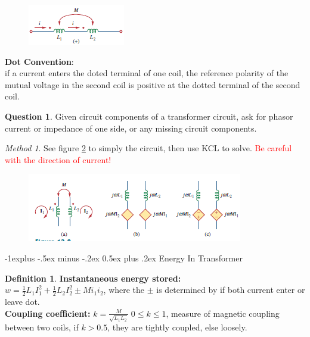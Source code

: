 \documentclass[10pt,landscape]{article}
\makeatletter
\renewcommand{\subsection}{\@startsection{subsection}{2}{0mm}%
                                {-1explus -.5ex minus -.2ex}%
                                {0.5ex plus .2ex}%
                                {\normalfont\normalsize\bfseries}}
\newcommand\todo[1]{\textcolor{red}{#1}}
\theoremstyle{definition}
\newtheorem*{question}{Question}
\newtheorem*{defin}{Definition}
\theoremstyle{remark}
\newtheorem*{method}{Method}
\makeatother
\begin{document}
\begin{multicols}{3}
\begin{figure}[H]
    \centering
    \includegraphics[width=0.5\linewidth]{202/figure/transformer_2_a.png}
    \caption{}
    \label{fig:trans_series}
\end{figure}

\textbf{Dot Convention}: \\
if a current enters the doted terminal of one coil, the reference polarity of the mutual voltage in the second coil is positive at the dotted terminal of the second coil.

\begin{question}
Given circuit components of a transformer circuit, ask for phasor current or impedance of one side, or any missing circuit components. 
\end{question}

\begin{method}
See figure \ref{fig:trans_simplification} to simply the circuit, then use KCL to solve. \todo{Be careful with the direction of current!}
\end{method}

\begin{figure}[H]
    \centering
    \includegraphics[width=\linewidth]{202/figure/transformer_1.png}
    \caption{}
    \label{fig:trans_simplification}
\end{figure}


\subsection{Energy In Transformer}
\begin{defin}
\textbf{Instantaneous energy stored:}\\
$w = \frac{1}{2}L_1I^2_1 + \frac{1}{2}L_2I^2_2 \pm M i_1i_2$, where the $\pm$ is determined by if both current enter or leave dot. \\
\textbf{Coupling coefficient: }
$k = \frac{M}{\sqrt{L_1L_2}} \; 0 \leq k \leq 1$, measure of magnetic coupling between two coils, if $k  > 0.5$, they are tightly coupled, else loosely. \\
\end{defin}


\end{multicols}
\end{document}
